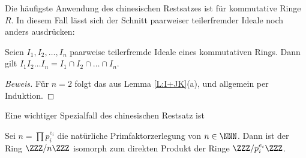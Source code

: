 \documentclass[12pt,a4paper,twoside]{article}
\begin{document}
Die h\"aufigste Anwendung des chinesischen Restsatzes ist f\"ur kommutative
Ringe $R$. In diesem Fall l\"asst sich der Schnitt paarweiser teilerfremder
Ideale noch anders ausdr\"ucken:
\begin{Lemma}
  Seien $I_1,I_2,\dots,I_n$ paarweise teilerfremde Ideale eines kommutativen
  Rings. Dann gilt $I_1I_2\dots I_n=I_1\cap I_2\cap\dots\cap I_n$.
\end{Lemma}
\begin{proof}[Beweis]
  F\"ur $n=2$ folgt das aus Lemma \ref{L:I+JK}(a), und allgemein per Induktion.
\end{proof}
Eine wichtiger Spezialfall des chinesischen Restsatz ist
\begin{Satz}
  Sei $n=\prod p_i^{e_i}$ die nat\"urliche Primfaktorzerlegung von
  $n\in\NNN$. Dann ist der Ring $\ZZZ/n\ZZZ$ isomorph zum direkten Produkt der
  Ringe $\ZZZ/p_i^{e_i}\ZZZ$.
\end{Satz}
\end{document}

